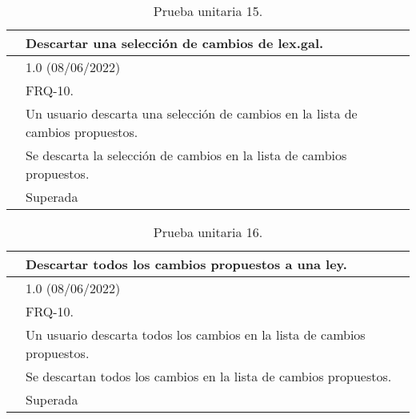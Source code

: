 \begin{table}[H]
\begin{center}
\begin{tabular}{|p{3cm}|p{10cm}|} \hline
\centering {\bf PU-15} & Descartar una selección de cambios de lex.gal.  \\ \hline\hline
\centering {\bf Versión} & 1.0 (08/06/2022) \\ \hline
\centering {\bf Dependencias} & FRQ-10. \\ \hline
\centering {\bf Descripción} &  Un usuario descarta una selección de cambios en la lista de cambios propuestos. \\ \hline
\centering {\bf Criterio de aceptación} & Se descarta la selección de cambios en la lista de cambios propuestos. \\ \hline
\centering {\bf Estado} & Superada \\ \hline
\end{tabular}
\caption{Prueba unitaria 15.}
\label{enlacePU15}
\end{center}
\end{table}

\begin{table}[H]
\begin{center}
\begin{tabular}{|p{3cm}|p{10cm}|} \hline
\centering {\bf PU-16} & Descartar todos los cambios propuestos a una ley.  \\ \hline\hline
\centering {\bf Versión} & 1.0 (08/06/2022) \\ \hline
\centering {\bf Dependencias} & FRQ-10. \\ \hline
\centering {\bf Descripción} &  Un usuario descarta todos los cambios en la lista de cambios propuestos. \\ \hline
\centering {\bf Criterio de aceptación} & Se descartan todos los cambios en la lista de cambios propuestos. \\ \hline
\centering {\bf Estado} & Superada \\ \hline
\end{tabular}
\caption{Prueba unitaria 16.}
\label{enlacePU16}
\end{center}
\end{table}

